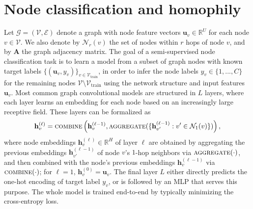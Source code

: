 \documentclass{esannV2p}
\begin{document}
\section{Node classification and homophily}\label{sec:background}
Let $\mathcal{G} = (\mathcal{V}, \mathcal{E})$ denote a graph with node feature vectors $\mathbf{u}_v \in \mathbb{R}^U$ for each node $v \in \mathcal{V}$.
We also denote by $\mathcal{N}_r(v)$ the set of nodes within $r$ hops of node $v$, and by $\mathbf{A}$ the graph adjacency matrix.
The goal of a semi-supervised node classification task is to learn a model from a subset of graph nodes with known target labels $\{(\mathbf{u}_v, y_v)\}_{v \in \mathcal{V}_{\mathrm{train}}}$, in order to infer the node labels $y_v \in \{1, ..., C\}$ for the remaining nodes $\mathcal{V} \setminus \mathcal{V}_{\mathrm{train}}$ using the network structure and input features $\mathbf{u}_v$.
Most common graph convolutional models are structured in $L$ layers, where each layer learns an embedding for each node based on an increasingly large receptive field.
These layers can be formalized as \cite{Xu2019}
\begin{equation}\label{eq:gnn-layer}
  \mathbf{h}_v^{(\ell)} = \textsc{combine}\left(\mathbf{h}_v^{(\ell-1)}, \textsc{aggregate}(\{\mathbf{h}_{v'}^{(\ell-1)} : v' \in \mathcal{N}_1(v)\})\right),
\end{equation}
where node embeddings $\mathbf{h}_v^{(\ell)} \in \mathbb{R}^H$ of layer $\ell$ are obtained by aggregating the previous embeddings $\mathbf{h}_{v'}^{(\ell-1)}$ of node $v$'s $1$-hop neighbors via $\textsc{aggregate}(\cdot)$, and then combined with the node's previous embeddings $\mathbf{h}_v^{(\ell-1)}$ via $\textsc{combine}(\cdot)$; for $\ell = 1$, $\mathbf{h}_v^{(0)} = \mathbf{u}_v$.
The final layer $L$ either directly predicts the one-hot encoding of target label $y_v$, or is followed by an MLP that serves this purpose.
The whole model is trained end-to-end by typically minimizing the cross-entropy loss.
\end{document}
